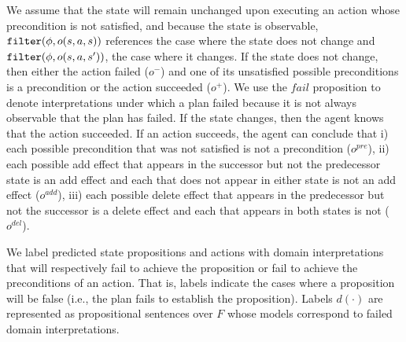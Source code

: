 \documentclass{article}
\begin{document}
\noindent We assume that the state will remain unchanged upon executing
an action whose precondition is not satisfied, and because the
state is observable, ${\tt filter}(\phi, o(s, a, s))$ references the case where
the state does not change and ${\tt filter}(\phi, o(s, a, s'))$, the case where
it changes.  If the state does not change, then either the action failed
($o^-$) and one of its unsatisfied possible preconditions is a precondition  or
the action succeeded ($o^+$).  We use the $fail$ proposition to denote
interpretations under which a plan failed because it is not always observable
that the plan has failed. If the state changes, then the agent knows that the
action succeeded. If an action  succeeds, the agent can conclude that i) each possible precondition that was not satisfied is not a precondition ($o^{pre}$), ii) each possible add effect that
appears in the successor but not the predecessor state is an add effect and each that does not appear in either state is not an add 
effect ($o^{add}$), iii) each possible delete effect that appears in the
predecessor but not the successor is a delete effect and each that  appears in both states is
not ($o^{del}$).



 We label predicted state propositions and actions with domain
interpretations that will respectively fail to achieve the proposition or fail
to achieve the preconditions of an action.  That is, labels indicate the cases
where a proposition will be false (i.e., the plan fails to establish the
proposition). Labels $d(\cdot)$ are represented as  propositional sentences over
$F$ whose models correspond to failed domain interpretations.
\end{document}
